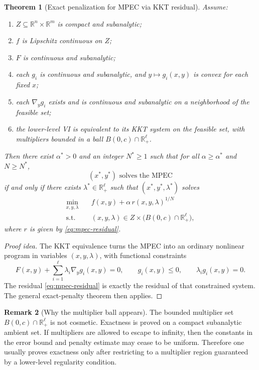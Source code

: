 \documentclass[pdflatex,sn-mathphys-num]{sn-jnl}%
\newtheorem{theorem}{Theorem}[section]
\theoremstyle{definition}
\newtheorem{remark}[theorem]{Remark}
\newcommand{\R}{\mathbb{R}}
\begin{document}
\begin{theorem}[Exact penalization for MPEC via KKT residual]
\label{thm:mpec-exact}
Assume:
\begin{enumerate}[label=(\roman*)]
    \item $Z\subseteq \R^n\times\R^m$ is compact and subanalytic;
    \item $f$ is Lipschitz continuous on $Z$;
    \item $F$ is continuous and subanalytic;
    \item each $g_i$ is continuous and subanalytic, and $y\mapsto g_i(x,y)$ is convex for each fixed $x$;
    \item each $\nabla_y g_i$ exists and is continuous and subanalytic on a neighborhood of the feasible set;
    \item the lower-level VI is equivalent to its KKT system on the feasible set, with multipliers bounded in a ball $B(0,c)\cap \R^\ell_+$.
\end{enumerate}
Then there exist $\alpha^\ast>0$ and an integer $N^\ast\ge 1$ such that for all $\alpha\ge \alpha^\ast$ and $N\ge N^\ast$,
\[
(x^\ast,y^\ast)\text{ solves the MPEC}
\]
if and only if there exists $\lambda^\ast\in \R^\ell_+$ such that $(x^\ast,y^\ast,\lambda^\ast)$ solves
\begin{equation}
\label{eq:mpec-penalty}
\begin{aligned}
    \min_{x,y,\lambda}\quad & f(x,y)+\alpha\,r(x,y,\lambda)^{1/N}\\
    \text{s.t.}\quad & (x,y,\lambda)\in Z\times\bigl(B(0,c)\cap \R^\ell_+\bigr),
\end{aligned}
\end{equation}
where $r$ is given by \eqref{eq:mpec-residual}.
\end{theorem}

\begin{proof}[Proof idea]
The KKT equivalence turns the MPEC into an ordinary nonlinear program in variables $(x,y,\lambda)$, with functional constraints
\[
F(x,y)+\sum_{i=1}^{\ell}\lambda_i \nabla_y g_i(x,y)=0,\qquad
g_i(x,y)\le 0,\qquad
\lambda_i g_i(x,y)=0.
\]
The residual \eqref{eq:mpec-residual} is exactly the residual of that constrained system. The general exact-penalty theorem then applies.
\end{proof}

\begin{remark}[Why the multiplier ball appears]
The bounded multiplier set $B(0,c)\cap \R^\ell_+$ is not cosmetic. Exactness is proved on a compact subanalytic ambient set. If multipliers are allowed to escape to infinity, then the constants in the error bound and penalty estimate may cease to be uniform. Therefore one usually proves exactness only after restricting to a multiplier region guaranteed by a lower-level regularity condition.
\end{remark}
\end{document}
